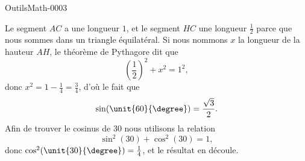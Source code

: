 
\begin{corrige}{OutilsMath-0003}

	Le segment $AC$ a une longueur $1$, et le segment $HC$ une longueur $\frac{ 1 }{2}$ parce que nous sommes dans un triangle équilatéral. Si nous nommons $x$ la longueur de la hauteur $AH$, le théorème de Pythagore dit que
	\begin{equation}
		\left( \frac{ 1 }{2} \right)^2+x^2=1^2,
	\end{equation}
	donc $x^2=1-\frac{1}{ 4 }=\frac{ 3 }{ 4 }$, d'où le fait que
	\begin{equation}
		\sin(\unit{60}{\degree})=\frac{ \sqrt{3} }{ 2 }.
	\end{equation}
	Afin de trouver le cosinus de \unit{30}{\degree} nous utilisons la relation
	\begin{equation}
		\sin^2(30)+\cos^2(30)=1,
	\end{equation}
	donc $\cos^2(\unit{30}{\degree})=\frac{1}{ 4 }$, et le résultat en découle.

\end{corrige}
